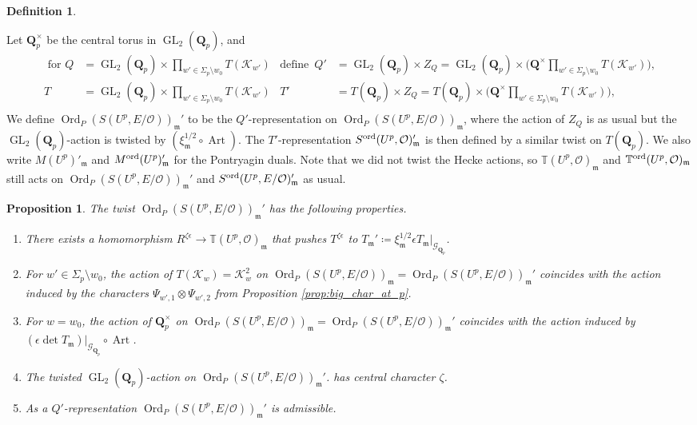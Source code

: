 \documentclass[leqno]{amsart}
\newtheorem{prop}[thm]{Proposition}
\theoremstyle{definition}
\newtheorem{defn}[thm]{Definition}
\theoremstyle{remark}
\newcommand{\oo}{\mathcal{O}}
\newcommand{\Q}{{\mathbf{Q}}}
\newcommand{\Qp}{\mathbf{Q}_p}
\DeclareMathOperator{\GL}{GL}
\DeclareMathOperator{\Art}{Art}
\newcommand{\fm}{\mathfrak{m}}
\DeclareMathOperator{\Ord}{Ord} %
\newcommand{\Gp}{\mathcal{G}_{\Qp}} %
\newcommand{\K}{{\mathcal{K}}} %
\newcommand{\TT}{\mathbb{T}} %
\newcommand{\ord}{\textnormal{ord}} %
\begin{document}
\begin{defn}\label{def:twist}

Let $\Qp^\times$ be the central torus in $\GL_2(\Qp)$, and 
\begin{align*}
\text{ for }
Q&=\GL_2(\Qp)\times \prod_{w'\in\Sigma_p\setminus{w_0}}T(\K_{w'}) & 
\text{define }\,
Q'&=\GL_2(\Qp)\times Z_Q=\GL_2(\Qp)\times 
\big(\Q^\times\prod_{w'\in\Sigma_p\setminus{w_0}}T(\K_{w'})\big),\\
T&=\GL_2(\Qp)\times \prod_{w'\in\Sigma_p\setminus{w_0}}T(\K_{w'}) & 
T'&=T(\Qp)\times Z_Q=T(\Qp)\times 
\big(\Q^\times\prod_{w'\in\Sigma_p\setminus{w_0}}T(\K_{w'})\big),\\
\end{align*}
We define $\Ord_P(S(U^p,E/\oo))_{\fm}'$
to be the $Q'$-representation on
$\Ord_P(S(U^p,E/\oo))_{\fm}$,
where the action of $Z_Q$ is as usual
but the $\GL_2(\Qp)$-action is twisted by 
$(\xi_{\fm}^{1/2}\circ\Art)$.
The $T'$-representation
$S^{\ord}(U^p,\oo)_\fm'$
is then defined by a similar twist on $T(\Qp)$.
We also write $M(U^p)'_\fm$ and $M^{\ord}(U^p)'_\fm$
for the Pontryagin duals.
Note that we did not twist the Hecke actions, 
so $\TT(U^p,\oo)_\fm$ and $\TT^{\ord}(U^p,\oo)_\fm$
still acts on $\Ord_P(S(U^p,E/\oo))_\fm'$
and $S^\ord(U^p,E/\oo)_\fm'$ as usual.
\end{defn}

\begin{prop}\label{lem:twist}
The twist $\Ord_P(S(U^p,E/\oo))_\fm'$
has the following properties.
\begin{enumerate}
\item There exists a homomorphism 
$R^{\zeta\epsilon}\to \TT(U^p,\oo)_\fm$
that pushes $T^{\zeta\epsilon}$ to 
$T_\fm'\coloneqq \xi_{\fm}^{1/2}\epsilon T_\fm\vert_{\Gp}$.
\item For $w'\in \Sigma_p\setminus{w_0}$,
the action of $T(\K_w)=\K_w^2$ on
$\Ord_P(S(U^p,E/\oo))_\fm=\Ord_P(S(U^p,E/\oo))_\fm'$
coincides with the action induced by
the characters $\Psi_{w',1}\otimes\Psi_{w',2}$ from
Proposition \ref{prop:big_char_at_p}.
\item For $w=w_0$,
the action of $\Qp^\times$ on
$\Ord_P(S(U^p,E/\oo))_\fm=\Ord_P(S(U^p,E/\oo))_\fm'$
coincides with the action induced by
$(\epsilon\det T_\fm)\vert_{\Gp}\circ \Art$.
\item
The twisted $\GL_2(\Qp)$-action on $\Ord_P(S(U^p,E/\oo))_\fm'$.
has central character $\zeta$.
\item 
As a $Q'$-representation
$\Ord_P(S(U^p,E/\oo))_\fm'$ is admissible.
\end{enumerate}
\end{prop}
\end{document}
